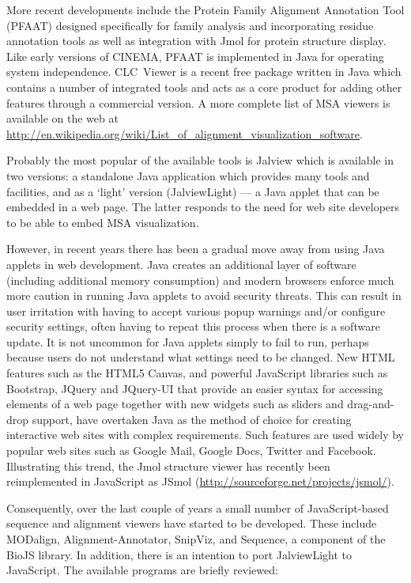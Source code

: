 \documentclass[12pt]{article}
\begin{document}
More recent developments include the Protein Family Alignment
Annotation Tool (PFAAT)\cite{johnson:pfaat} designed specifically for
family analysis and incorporating residue annotation tools as well as
integration with Jmol for protein structure display. Like early
versions of CINEMA, PFAAT is implemented in Java for operating system
independence. CLC~Viewer is a recent free package written in Java
which contains a number of integrated tools and acts as a core product
for adding other features through a commercial version.  A more
complete list of MSA viewers is available on the web at
\url{http://en.wikipedia.org/wiki/List_of_alignment_visualization_software}.

Probably the most popular of the available tools is
Jalview\cite{clamp:jalview} which is available in two versions: a
standalone Java application which provides many tools and facilities,
and as a `light' version (JalviewLight) --- a Java applet that can be
embedded in a web page. The latter responds to the need for web site
developers to be able to embed MSA visualization.

However, in recent years there has been a gradual move away from using
Java applets in web development.  Java creates an additional layer of
software (including additional memory consumption) and modern browsers
enforce much more caution in running Java applets to avoid security
threats. This can result in user irritation with having to accept
various popup warnings and/or configure security settings, often
having to repeat this process when there is a software update. It is
not uncommon for Java applets simply to fail to run, perhaps because
users do not understand what settings need to be changed.  New HTML
features such as the HTML5 Canvas, and powerful JavaScript libraries
such as Bootstrap, JQuery and JQuery-UI that provide an easier syntax
for accessing elements of a web page together with new widgets such as
sliders and drag-and-drop support, have overtaken Java as the method
of choice for creating interactive web sites with complex
requirements.  Such features are used widely by popular web sites such
as Google Mail, Google Docs, Twitter and Facebook.  Illustrating this
trend, the Jmol structure viewer has recently been reimplemented in
JavaScript as JSmol (\url{http://sourceforge.net/projects/jsmol/}).

Consequently, over the last couple of years a small number of
JavaScript-based sequence and alignment viewers have started to be
developed. These include MODalign\cite{barbato:modalign},
Alignment-Annotator\cite{gille:2014aa}, SnipViz\cite{jaschob:2014},
and Sequence\cite{gomez:2014}, a component of the BioJS
library\cite{corpas:biojs}. In addition, there is an intention to port
JalviewLight to JavaScript.  The available programs are briefly
reviewed:
\end{document}
